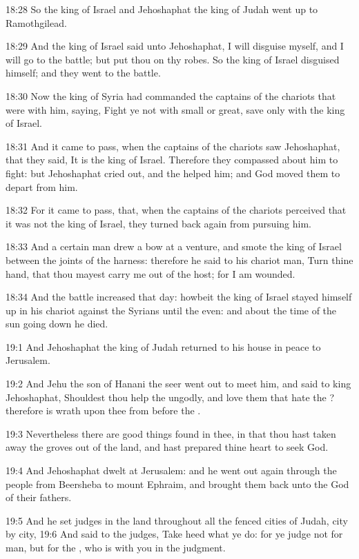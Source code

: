 18:28 So the king of Israel and Jehoshaphat the king of Judah went up to Ramothgilead.

18:29 And the king of Israel said unto Jehoshaphat, I will disguise myself, and I will go to the battle; but put thou on thy robes. So the king of Israel disguised himself; and they went to the battle.

18:30 Now the king of Syria had commanded the captains of the chariots that were with him, saying, Fight ye not with small or great, save only with the king of Israel.

18:31 And it came to pass, when the captains of the chariots saw Jehoshaphat, that they said, It is the king of Israel. Therefore they compassed about him to fight: but Jehoshaphat cried out, and the \LORD helped him; and God moved them to depart from him.

18:32 For it came to pass, that, when the captains of the chariots perceived that it was not the king of Israel, they turned back again from pursuing him.

18:33 And a certain man drew a bow at a venture, and smote the king of Israel between the joints of the harness: therefore he said to his chariot man, Turn thine hand, that thou mayest carry me out of the host; for I am wounded.

18:34 And the battle increased that day: howbeit the king of Israel stayed himself up in his chariot against the Syrians until the even: and about the time of the sun going down he died.

19:1 And Jehoshaphat the king of Judah returned to his house in peace to Jerusalem.

19:2 And Jehu the son of Hanani the seer went out to meet him, and said to king Jehoshaphat, Shouldest thou help the ungodly, and love them that hate the \LORD? therefore is wrath upon thee from before the \LORD.

19:3 Nevertheless there are good things found in thee, in that thou hast taken away the groves out of the land, and hast prepared thine heart to seek God.

19:4 And Jehoshaphat dwelt at Jerusalem: and he went out again through the people from Beersheba to mount Ephraim, and brought them back unto the \LORD God of their fathers.

19:5 And he set judges in the land throughout all the fenced cities of Judah, city by city, 19:6 And said to the judges, Take heed what ye do: for ye judge not for man, but for the \LORD, who is with you in the judgment.

